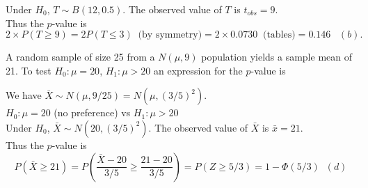 \documentclass[bigtut]{tutorial}
\begin{document}
\begin{tutorial}
\begin{questions}
\begin{solution}
  Under $H_0$, $T  \sim B(12,0.5)$. The observed value of $T$ is $t_{obs}=9$.  \\

 Thus the $p$-value is 
\[ 2 \times P(T \geq 9)  = 2P(T \leq 3) \ \text{ (by symmetry)} = 2 \times 0.0730 \ \text{ (tables)} = 0.146 \;\;\; (b). \]
\end{solution}



\vspace{1cm}
\hspace{-1cm}

\question  
A random sample of size 25 from a $N(\mu,9)$ population yields a sample mean of 21. To test $H_0\colon\mu=20$,
$H_1\colon\mu>20$ an expression for the $p$-value is

\begin{solution}
  We have $\bar{X}  \sim N(\mu, 9/25)= N(\mu, (3/5)^2)$.  \\

  $H_0: \mu=20$ (no preference) vs $H_1: \mu > 20$ \\

  Under $H_0$, $\bar{X}  \sim N(20, (3/5)^2)$. 
The observed value of $\bar{X}$ is $\bar{x}=21$. \\

 Thus the $p$-value is 
\[  P(\bar{X} \geq 21)  = P( \frac{\bar{X}  - 20}{3/5}  \geq \frac{21-20}{3/5})= P(Z \geq 5/3) = 1-\Phi(5/3) \;\;  (d) \]


\end{solution}
\end{questions}
\end{tutorial}
\end{document}
